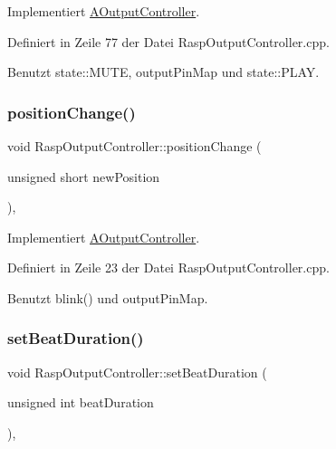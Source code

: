 Implementiert \hyperlink{class_a_output_controller_a15c1300df5606bf7d4838b41a45c31e3}{A\+Output\+Controller}.



Definiert in Zeile 77 der Datei Rasp\+Output\+Controller.\+cpp.



Benutzt state\+::\+M\+U\+TE, output\+Pin\+Map und state\+::\+P\+L\+AY.

\mbox{\label{class_rasp_output_controller_afce87d510c0564567e4250b22639d5e0}} 
\subsubsection{\texorpdfstring{position\+Change()}{positionChange()}}
{\footnotesize\ttfamily void Rasp\+Output\+Controller\+::position\+Change (\begin{DoxyParamCaption}\item[{unsigned short}]{new\+Position }\end{DoxyParamCaption})\hspace{0.3cm}{\ttfamily [override]}, {\ttfamily [virtual]}}



Implementiert \hyperlink{class_a_output_controller_a5a818a40e2911411d378032b8b2fb6c8}{A\+Output\+Controller}.



Definiert in Zeile 23 der Datei Rasp\+Output\+Controller.\+cpp.



Benutzt blink() und output\+Pin\+Map.

\mbox{\label{class_rasp_output_controller_a5fd551f1aba056356befd71e5bff23f1}} 
\subsubsection{\texorpdfstring{set\+Beat\+Duration()}{setBeatDuration()}}
{\footnotesize\ttfamily void Rasp\+Output\+Controller\+::set\+Beat\+Duration (\begin{DoxyParamCaption}\item[{unsigned int}]{beat\+Duration }\end{DoxyParamCaption})\hspace{0.3cm}{\ttfamily [override]}, {\ttfamily [virtual]}}



